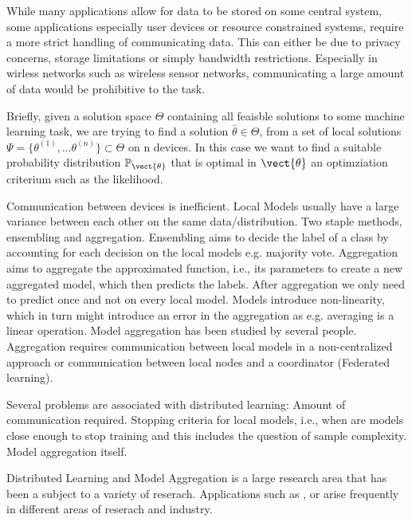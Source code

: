 While many applications allow for data to be stored on some central system, some applications especially user devices or resource constrained systems, require a more strict handling of communicating data.
This can either be due to privacy concerns, storage limitations or simply bandwidth restrictions.
Especially in wirless networks such as wireless sensor networks, communicating a large amount of data would be prohibitive to the task.


Briefly, given a solution space $\Theta$ containing all feaisble solutions to some machine learning task, we are trying to find a solution $\bar{\theta} \in \Theta$, from a set of local solutions $\Psi = \{\theta^{(1)}, \ldots \theta^{(n)}\} \subset \Theta$ on n devices.
In this case we want to find a suitable probability distribution $\mathbb{P}_{\vect{\theta}}$ that is optimal in $\vect{\theta}$ \wrt an optimziation criterium such as the likelihood.

Communication between devices is inefficient.
Local Models usually have a large variance between each other on the same data/distribution.
Two staple methods, ensembling and aggregation.
Ensembling aims to decide the label of a class by accounting for each decision on the local models e.g. majority vote.
Aggregation aims to aggregate the approximated function, i.e., its parameters to create a new aggregated model, which then predicts the labels.
After aggregation we only need to predict once and not on every local model.
Models introduce non-linearity, which in turn might introduce an error in the aggregation as e.g. averaging is a linear operation.
Model aggregation has been studied by several people.
Aggregation requires communication between local models in a non-centralized approach or communication between local nodes and a coordinator (Federated learning).

Several problems are associated with distributed learning:
Amount of communication required.
Stopping criteria for local models, i.e., when are models close enough to stop training and this includes the question of sample complexity.
Model aggregation itself.

Distributed Learning and Model Aggregation is a large research area that has been a subject to a variety of reserach.
Applications such as ,  or  arise frequently in different areas of reserach and industry. 

